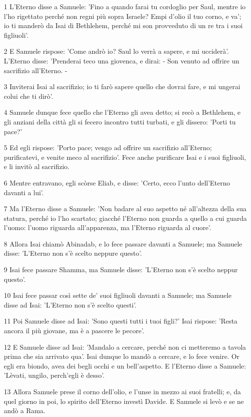 \par 1 L'Eterno disse a Samuele: 'Fino a quando farai tu cordoglio per Saul, mentre io l'ho rigettato perché non regni più sopra Israele? Empi d'olio il tuo corno, e va'; io ti manderò da Isai di Bethlehem, perché mi son provveduto di un re tra i suoi figliuoli'.
\par 2 E Samuele rispose: 'Come andrò io? Saul lo verrà a sapere, e mi ucciderà'. L'Eterno disse: 'Prenderai teco una giovenca, e dirai: - Son venuto ad offrire un sacrifizio all'Eterno. -
\par 3 Inviterai Isai al sacrifizio; io ti farò sapere quello che dovrai fare, e mi ungerai colui che ti dirò'.
\par 4 Samuele dunque fece quello che l'Eterno gli avea detto; si recò a Bethlehem, e gli anziani della città gli si fecero incontro tutti turbati, e gli dissero: 'Porti tu pace?'
\par 5 Ed egli rispose: 'Porto pace; vengo ad offrire un sacrifizio all'Eterno; purificatevi, e venite meco al sacrifizio'. Fece anche purificare Isai e i suoi figliuoli, e li invitò al sacrifizio.
\par 6 Mentre entravano, egli scòrse Eliab, e disse: 'Certo, ecco l'unto dell'Eterno davanti a lui'.
\par 7 Ma l'Eterno disse a Samuele: 'Non badare al suo aspetto né all'altezza della sua statura, perché io l'ho scartato; giacché l'Eterno non guarda a quello a cui guarda l'uomo: l'uomo riguarda all'apparenza, ma l'Eterno riguarda al cuore'.
\par 8 Allora Isai chiamò Abinadab, e lo fece passare davanti a Samuele; ma Samuele disse: 'L'Eterno non s'è scelto neppure questo'.
\par 9 Isai fece passare Shamma, ma Samuele disse: 'L'Eterno non s'è scelto neppur questo'.
\par 10 Isai fece passar così sette de' suoi figliuoli davanti a Samuele; ma Samuele disse ad Isai: 'L'Eterno non s'è scelto questi'.
\par 11 Poi Samuele disse ad Isai: 'Sono questi tutti i tuoi figli?' Isai rispose: 'Resta ancora il più giovane, ma è a pascere le pecore'.
\par 12 E Samuele disse ad Isai: 'Mandalo a cercare, perché non ci metteremo a tavola prima che sia arrivato qua'. Isai dunque lo mandò a cercare, e lo fece venire. Or egli era biondo, avea dei begli occhi e un bell'aspetto. E l'Eterno disse a Samuele: 'Lèvati, ungilo, perch'egli è desso'.
\par 13 Allora Samuele prese il corno dell'olio, e l'unse in mezzo ai suoi fratelli; e, da quel giorno in poi, lo spirito dell'Eterno investì Davide. E Samuele si levò e se ne andò a Rama.
